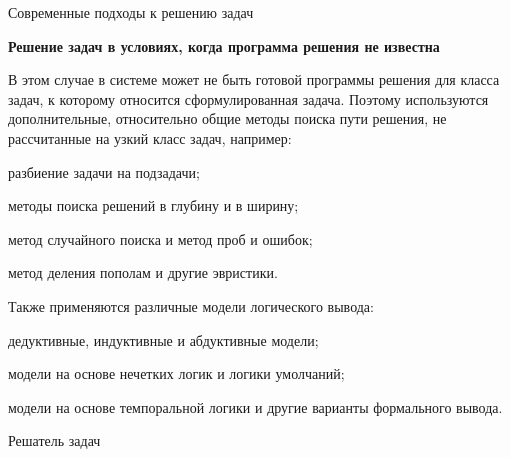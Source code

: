 \begin{frame}{Современные подходы к решению задач}
	\topline
	\justifying
	\vspace*{\fill}
	
	\footnotesize
	
	\vspace{2mm}
	\textbf{Решение задач в условиях, когда программа решения не известна}
	
	\vspace{1mm}
	В этом случае в системе может не быть готовой программы решения для класса
	задач, к которому относится сформулированная задача. Поэтому используются
	дополнительные, относительно общие методы поиска пути решения, не
	рассчитанные на узкий класс задач, например:
	\begin{textitemize}
		\item разбиение задачи на подзадачи;
		\item методы поиска решений в глубину и в ширину;
		\item метод случайного поиска и метод проб и ошибок;
		\item метод деления пополам и другие эвристики.
	\end{textitemize}
	
	Также применяются различные модели логического вывода:
	\begin{textitemize}
		\item дедуктивные, индуктивные и абдуктивные модели;
		\item модели на основе нечетких логик и логики умолчаний;
		\item модели на основе темпоральной логики и другие варианты формального вывода.
	\end{textitemize}
	
\end{frame}

\begin{frame}{Решатель задач}
	\topline
	\justifying
	
	\begin{SCn}
	\end{SCn}
\end{frame}

